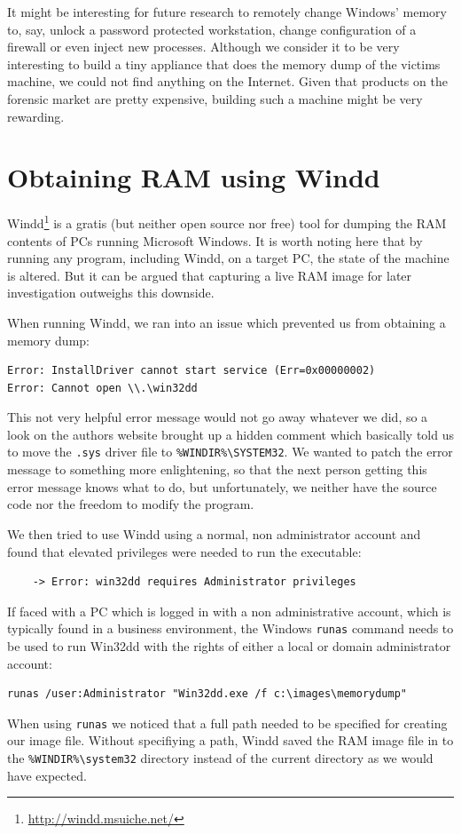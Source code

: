 \documentclass[a4paper,
    11pt,
    normalheadings,
    parindent,
    UKenglish,
    abstracton,
    ]{scrartcl}
\begin{document}
It might be interesting for future research to remotely change Windows' memory to, say, unlock a password protected workstation, change configuration of a firewall or even inject new processes.
Although we consider it to be very interesting to build a tiny appliance that does the memory dump of the victims machine, we could not find anything on the Internet.
Given that products on the forensic market are pretty expensive, building such a machine might be very rewarding.


\section{Obtaining RAM using Windd}
Windd\footnote{\url{http://windd.msuiche.net/}} is a gratis (but neither open source nor free) tool for dumping the RAM contents of PCs running Microsoft Windows.
It is worth noting here that by running any program, including Windd, on a target PC, the state of the machine is altered.
But it can be argued that capturing a live RAM image for later investigation outweighs this downside.


When running Windd, we ran into an issue which prevented us from obtaining a memory dump:
\begin{verbatim}
Error: InstallDriver cannot start service (Err=0x00000002)
Error: Cannot open \\.\win32dd
\end{verbatim}
This not very helpful error message would not go away whatever we did, so a look on the authors website brought up a hidden comment which basically told us to move the \texttt{.sys} driver file to \texttt{\%WINDIR\%\textbackslash{}SYSTEM32}.
We wanted to patch the error message to something more enlightening, so that the next person getting this error message knows what to do, but unfortunately, we neither have the source code nor the freedom to modify the program.

We then tried to use Windd using a normal, non administrator account and found that elevated privileges were needed to run the executable:
\begin{verbatim}
    -> Error: win32dd requires Administrator privileges
\end{verbatim}
If faced with a PC which is logged in with a non administrative account, which is typically found in a business environment, the Windows \texttt{runas} command needs to  be used to run Win32dd with the rights of either a local or domain administrator account:
\begin{verbatim}
runas /user:Administrator "Win32dd.exe /f c:\images\memorydump"
\end{verbatim}
When using \texttt{runas} we noticed that a full path needed to be specified for creating our image file.
Without specifiying a path, Windd saved the RAM image file in to the \texttt{\%WINDIR\%\textbackslash{}system32} directory instead of the current directory as we would have expected.
\end{document}
